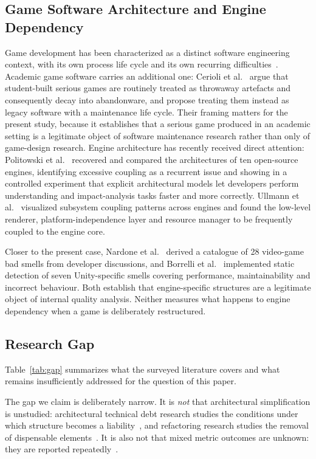 \documentclass{sbc2019}%
\begin{document}
\subsection{Game Software Architecture and Engine Dependency}

Game development has been characterized as a distinct software engineering
context, with its own process life cycle and its own recurring difficulties~\cite{aleem2016}. Academic game software carries an additional one: Cerioli et
al.\ \cite{cerioli2026} argue that student-built serious games are routinely
treated as throwaway artefacts and consequently decay into abandonware, and
propose treating them instead as legacy software with a maintenance life cycle.
Their framing matters for the present study, because it establishes that a serious
game produced in an academic setting is a legitimate object of software
maintenance research rather than only of game-design research. Engine architecture has recently received direct attention:
Politowski et al.\ \cite{politowski2025} recovered and compared the
architectures of ten open-source engines, identifying excessive coupling as a
recurrent issue and showing in a controlled experiment that explicit
architectural models let developers perform understanding and impact-analysis
tasks faster and more correctly. Ullmann et al.\ \cite{ullmann2023} visualized
subsystem coupling patterns across engines and found the low-level renderer,
platform-independence layer and resource manager to be frequently coupled to
the engine core.

Closer to the present case, Nardone et al.\ \cite{nardone2023} derived a
catalogue of 28 video-game bad smells from developer discussions, and Borrelli
et al.\ \cite{borrelli2020} implemented static detection of seven Unity-specific
smells covering performance, maintainability and incorrect behaviour. Both
establish that engine-specific structures are a legitimate object of internal
quality analysis. Neither measures what happens to engine dependency when a
game is deliberately restructured.

\subsection{Research Gap}\label{sec:gap}

Table~\ref{tab:gap} summarizes what the surveyed literature covers and what
remains insufficiently addressed for the question of this paper.

The gap we claim is deliberately narrow. It is \emph{not} that architectural
simplification is unstudied: architectural technical debt research studies the
conditions under which structure becomes a liability~\cite{verdecchia2020,verdecchia2021,li2022}, and refactoring research studies
the removal of dispensable elements~\cite{fowler2018,romano2020}. It is also
not that mixed metric outcomes are unknown: they are reported repeatedly~\cite{szoke2017,bavota2015,palomba2018}.
\end{document}
